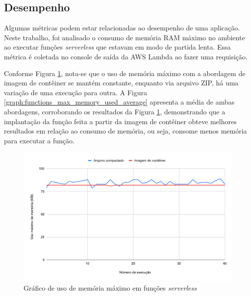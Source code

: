 \documentclass[conference]{IEEEtran}
\begin{document}
\subsection{Desempenho}
\label{subsec:performance}

Algumas métricas podem estar relacionadas ao desempenho de uma aplicação. Neste trabalho, foi analisado o consumo de memória RAM máximo no ambiente ao executar funções \textit{serverless} que estavam em modo de partida lenta. Essa métrica é coletada no console de saída da AWS Lambda ao fazer uma requisição.

Conforme Figura \ref{graph:functions_max_memory_used}, nota-se que o uso de memória máximo com a abordagem de imagem de contêiner se mantém constante, enquanto via arquivo ZIP, há uma variação de uma execução para outra. A Figura \ref{graph:functions_max_memory_used_average} apresenta a média de ambas abordagens, corroborando os resultados da Figura \ref{graph:functions_max_memory_used}, demonstrando que a implantação da função feita a partir da imagem de contêiner obteve melhores resultados em relação ao consumo de memória, ou seja, consome menos memória para executar a função. 

\begin{figure}[H]
    \centering 
    \includegraphics [width=\linewidth]{images/max-memory-use-PT.pdf}
    \par
    \caption{Gráfico de uso de memória máximo em funções \textit{serverless}}
    \label{graph:functions_max_memory_used}
\end{figure}
\end{document}
